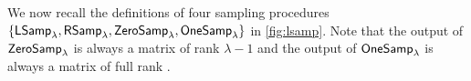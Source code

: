 We now recall the definitions of four sampling procedures $\{{\mathsf{LSamp}}_\lambda,{\mathsf{RSamp}}_\lambda, \allowbreak{\mathsf{ZeroSamp}}_\lambda,{\mathsf{OneSamp}}_\lambda\}$ in \cref{fig:lsamp}. Note that the output of ${\mathsf{ZeroSamp}}_\lambda$ is always a matrix of rank $\lambda-1$ and the output of ${\mathsf{OneSamp}}_\lambda$ is always a matrix of full rank \cite{C:DegVaiVas16}.
\begin{figure}[h]
\begin{center}
\end{center}
\end{figure}
